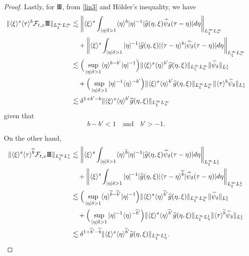 \documentclass[%
11pt,  reqno]{amsart}
\newcommand{\jap}[1]{\langle #1 \rangle}
\newcommand{\III}{\textup{I \hspace{-2.9mm} I \hspace{-2.9mm} I}}
\newcommand{\5}{\textup{V}}
\newcommand{\noi}{\noindent}
\newcommand{\ft}{\widehat}
\newcommand{\les}{\lesssim}
\newcommand{\dl}{\delta}
\newcommand{\F}{\mathcal{F}}
\newcommand{\wt}{\widetilde}
\theoremstyle{remark}
\numberwithin{equation}{section}
\numberwithin{theorem}{section}
\begin{document}
{\begin{proof}
			
			
			
			\noi
			Lastly, for $\III$, from \eqref{lin3} and H\"older's inequality, we have
			\begin{equation}
				\begin{aligned}
					\| \jap{\xi}^s \jap{\tau}^b \F_{t,x} \III \|_{L^\infty_\xi L^\infty_\tau} & \les \bigg\| \jap{\xi}^s \int_{|\eta|\dl >1} \jap{\eta}^b |\eta|^{-1} |\ft{g}(\eta, \xi) \ft{\psi}_\dl(\tau-\eta) | d\eta \bigg\|_{L^\infty_\xi L^\infty_\tau} \\
					& \quad + \bigg\| \jap{\xi}^s \int_{|\eta|\dl >1}  |\eta|^{-1} |\ft{g}(\eta, \xi)| \jap{\tau - \eta}^b | \ft{\psi}_\dl(\tau-\eta) | d\eta \bigg\|_{L^\infty_\xi L^\infty_\tau} \\
					& \les \Big( \sup_{|\eta|\dl>1} \jap{\eta}^{b-b'} |\eta|^{-1} \Big) \| \jap{\xi}^s \jap{\eta}^{b'} \ft{g}(\eta, \xi) \|_{L^\infty_\xi L^\infty_\eta} \| \ft{\psi}_\dl \|_{L^1_\tau} \\
					& \quad + \Big( \sup_{|\eta|\dl>1} |\eta|^{-1} \jap{\eta }^{-b'} \Big)  \| \jap{\xi}^s \jap{\eta}^{b'} \ft{g}(\eta, \xi) \|_{L^\infty_\xi L^\infty_\eta} \| \jap{\tau}^{b} \ft{\psi}_\dl \|_{L^1_\tau } \\
					& \les \dl^{1+b'-b} \| \jap{\xi}^s \jap{\eta}^{b'} \ft{g}(\eta, \xi) \|_{L^\infty_\xi L^\infty_\eta}
				\end{aligned}
				\label{lin6a}
			\end{equation}
			given that
			\begin{equation}
				b-b' < 1 \quad \text{and} \quad b'>-1.
				\label{lin6b}
			\end{equation}
			
			\noi
			On the other hand,
			\begin{equation}
				\begin{aligned}
					\| \jap{\xi}^s \jap{\tau}^{\wt{b}} \F_{t,x} \III \|_{L^\infty_\xi L^1_\tau} & \les \bigg\| \jap{\xi}^s \int_{|\eta|\dl >1} \jap{\eta}^{\tilde{b}} |\eta|^{-1} |\ft{g}(\eta, \xi) \ft{\psi}_\dl(\tau-\eta) | d\eta \bigg\|_{L^\infty_\xi L^1_\tau} \\
					& \quad + \bigg\| \jap{\xi}^s \int_{|\eta|\dl >1}  |\eta|^{-1} |\ft{g}(\eta, \xi)| \jap{\tau - \eta}^{\wt{b}} | \ft{\psi}_\dl(\tau-\eta) | d\eta \bigg\|_{L^\infty_\xi L^1_\tau} \\
					& \les \Big( \sup_{|\eta|\dl>1} \jap{\eta}^{\wt{b}-\wt{b}'} |\eta|^{-1} \Big) \| \jap{\xi}^s \jap{\eta}^{\wt{b}'} \ft{g}(\eta, \xi) \|_{L^\infty_\xi L^\infty_\eta} \| \ft{\psi}_\dl \|_{L^1_\tau} \\
					& \quad + \Big( \sup_{|\eta|\dl>1} |\eta|^{-1} \jap{\eta }^{-\wt{b}'} \Big)  \| \jap{\xi}^s \jap{\eta}^{\wt{b}'} \ft{g}(\eta, \xi) \|_{L^\infty_\xi L^1_\eta} \| \jap{\tau}^{\wt{b}} \ft{\psi}_\dl \|_{L^1_\tau } \\
					& \les \dl^{1+\wt{b}'-\wt{b}} \| \jap{\xi}^s \jap{\eta}^{\wt{b}'} \ft{g}(\eta, \xi) \|_{L^\infty_\xi L^1_\eta}.
				\end{aligned}
				\label{lin6c}
			\end{equation}
			

\end{proof}}
\end{document}
